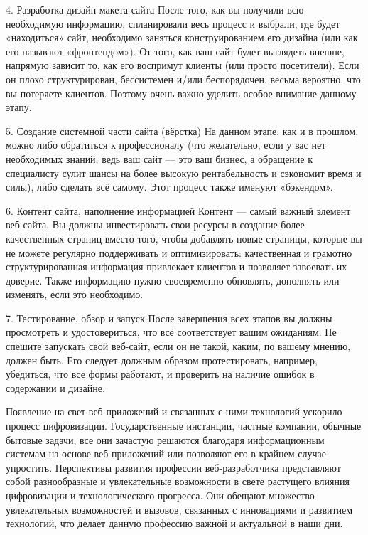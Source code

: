 \documentclass[referat, times]{SCWorks}
\begin{document}
4. Разработка дизайн-макета сайта
После того, как вы получили всю необходимую информацию,
спланировали весь процесс и выбрали, где будет «находиться» сайт, необходимо
заняться конструированием его дизайна (или как его называют «фронтендом»).
От того, как ваш сайт будет выглядеть внешне, напрямую зависит то, как
его воспримут клиенты (или просто посетители). Если он плохо структурирован,
бессистемен и/или беспорядочен, весьма вероятно, что вы потеряете клиентов.
Поэтому очень важно уделить особое внимание данному этапу.

5. Создание системной части сайта (вёрстка)
На данном этапе, как и в прошлом, можно либо обратиться к
профессионалу (что желательно, если у вас нет необходимых знаний; ведь ваш 
сайт --- это ваш бизнес, а обращение к специалисту сулит шансы на более высокую
рентабельность и сэкономит время и силы), либо сделать всё самому. Этот
процесс также именуют «бэкендом».

6. Контент сайта, наполнение информацией
Контент --- самый важный элемент веб-сайта. Вы должны инвестировать
свои ресурсы в создание более качественных страниц вместо того, чтобы
добавлять новые страницы, которые вы не можете регулярно поддерживать и
оптимизировать: качественная и грамотно структурированная информация
привлекает клиентов и позволяет завоевать их доверие. Также информацию
нужно своевременно обновлять, дополнять или изменять, если это необходимо.

7. Тестирование, обзор и запуск
После завершения всех этапов вы должны просмотреть и удостовериться,
что всё соответствует вашим ожиданиям.
Не спешите запускать свой веб-сайт, если он не такой, каким, по вашему
мнению, должен быть. Его следует должным образом протестировать, например,
убедиться, что все формы работают, и проверить на наличие ошибок в
содержании и дизайне\cite{13}.

\conclusion
Появление на свет веб-приложений и связанных с ними технологий ускорило процесс цифровизации. Государственные инстанции, частные компании, обычные бытовые задачи, все они зачастую решаются благодаря информационным системам на основе веб-приложений или позволяют его в крайнем случае упростить.
Перспективы развития профессии веб-разработчика представляют собой разнообразные и увлекательные возможности в свете растущего влияния цифровизации и технологического прогресса. Они обещают множество увлекательных возможностей и вызовов, связанных с инновациями и развитием технологий, что делает данную профессию важной и актуальной в наши дни.

\nocite{*}




\appendix
\end{document}
